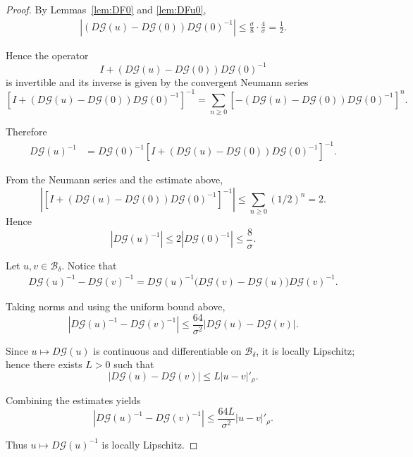 \documentclass[10pt,a4paper]{amsart}
\newcommand{\Bs}{{\mathscr{B}}}
\newcommand{\GG}{{\mathcal G}}
\begin{document}
\begin{proof}
By Lemmas~\ref{lem:DF0} and \ref{lem:DFu0},
\begin{align*}
| (D\GG(u)-D\GG(0))D\GG(0)^{-1} |
\leq \frac{\sigma}{8}\cdot\frac{4}{\sigma}= \frac12.
\end{align*}

Hence the operator
\[
I+(D\GG(u)-D\GG(0))D\GG(0)^{-1}
\]
is invertible and its inverse is given by the convergent Neumann series
\[
\left[I+(D\GG(u)-D\GG(0))D\GG(0)^{-1}\right]^{-1}
=
\sum_{n\ge 0} \left[-(D\GG(u)-D\GG(0))D\GG(0)^{-1}\right]^n.
\]

Therefore
\begin{align*}
D\GG(u)^{-1}
&= D\GG(0)^{-1}
\left[I+(D\GG(u)-D\GG(0))D\GG(0)^{-1}\right]^{-1}.
\end{align*}


From the Neumann series and the estimate above,
\[
\left|
\left[I+(D\GG(u)-D\GG(0))D\GG(0)^{-1}\right]^{-1}
\right|
\leq \sum_{n\ge 0} (1/2)^n = 2.
\]
Hence
\[
|D\GG(u)^{-1}|
\leq 2|D\GG(0)^{-1}|
\leq \frac{8}{\sigma}.
\]

%
Let \(u,v \in \Bs_\delta\). 
Notice that
\begin{align*}
D\GG(u)^{-1}-D\GG(v)^{-1}
=
D\GG(u)^{-1}\bigl(D\GG(v)-D\GG(u)\bigr)D\GG(v)^{-1}.
\end{align*}

Taking norms and using the uniform bound above,
\[
|D\GG(u)^{-1}-D\GG(v)^{-1}|
\le
\frac{64}{\sigma^2}
|D\GG(u)-D\GG(v)|.
\]

Since \(u \mapsto D\GG(u)\) is continuous and differentiable on \(\Bs_\delta\),
it is locally Lipschitz; hence there exists \(L>0\) such that
\[
|D\GG(u)-D\GG(v)|\le L|u-v|'_\rho.
\]

Combining the estimates yields
\[
|D\GG(u)^{-1}-D\GG(v)^{-1}|
\le \frac{64L}{\sigma^2}|u-v|'_\rho.
\]

Thus \(u \mapsto D\GG(u)^{-1}\) is locally Lipschitz.

\end{proof}
\end{document}
